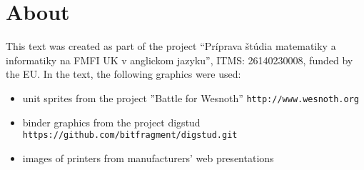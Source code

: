 \section*{About}

This text was created as part of the project ``Príprava štúdia matematiky a informatiky na FMFI UK 
v anglickom jazyku'', ITMS: 26140230008, funded by the EU.
\vfill
\noindent
In the text, the following graphics were used: \\
\begin{itemize}
  \item unit sprites from the project ''Battle for Wesnoth'' {\tt http://www.wesnoth.org}
  \item binder graphics from the project digstud {\tt https://github.com/bitfragment/digstud.git}
  \item images of printers from manufacturers' web presentations
\end{itemize}

